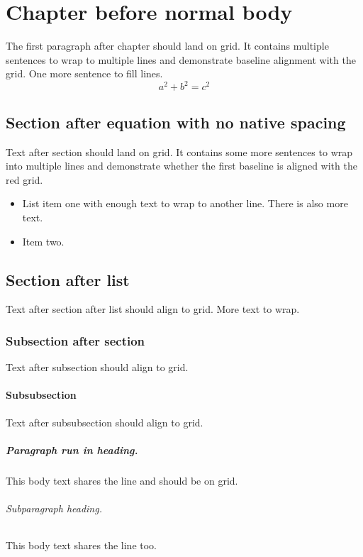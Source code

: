\documentclass{report}
\begin{document}
\chapter{Chapter before normal body}
The first paragraph after chapter should land on grid. It contains multiple sentences to wrap to multiple lines and demonstrate baseline alignment with the grid. One more sentence to fill lines.
\begin{equation}
  a^2+b^2=c^2
\end{equation}
\section{Section after equation with no native spacing}
Text after section should land on grid. It contains some more sentences to wrap into multiple lines and demonstrate whether the first baseline is aligned with the red grid.
\begin{itemize}
\item List item one with enough text to wrap to another line. There is also more text.
\item Item two.
\end{itemize}
\section{Section after list}
Text after section after list should align to grid. More text to wrap.
\subsection{Subsection after section}
Text after subsection should align to grid.
\subsubsection{Subsubsection}
Text after subsubsection should align to grid.
\paragraph{Paragraph run in heading.} This body text shares the line and should be on grid.
\subparagraph{Subparagraph heading.} This body text shares the line too.
\end{document}
